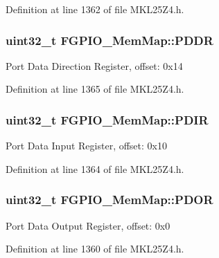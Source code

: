 Definition at line 1362 of file M\+K\+L25\+Z4.\+h.

\subsubsection[{\texorpdfstring{P\+D\+DR}{PDDR}}]{\setlength{\rightskip}{0pt plus 5cm}uint32\+\_\+t F\+G\+P\+I\+O\+\_\+\+Mem\+Map\+::\+P\+D\+DR}\hypertarget{struct_f_g_p_i_o___mem_map_add5e56027e27e8a0076bf1c38fdcaed5}{}\label{struct_f_g_p_i_o___mem_map_add5e56027e27e8a0076bf1c38fdcaed5}
Port Data Direction Register, offset\+: 0x14 

Definition at line 1365 of file M\+K\+L25\+Z4.\+h.

\subsubsection[{\texorpdfstring{P\+D\+IR}{PDIR}}]{\setlength{\rightskip}{0pt plus 5cm}uint32\+\_\+t F\+G\+P\+I\+O\+\_\+\+Mem\+Map\+::\+P\+D\+IR}\hypertarget{struct_f_g_p_i_o___mem_map_af869762f9d42637f8fc09354e8947834}{}\label{struct_f_g_p_i_o___mem_map_af869762f9d42637f8fc09354e8947834}
Port Data Input Register, offset\+: 0x10 

Definition at line 1364 of file M\+K\+L25\+Z4.\+h.

\subsubsection[{\texorpdfstring{P\+D\+OR}{PDOR}}]{\setlength{\rightskip}{0pt plus 5cm}uint32\+\_\+t F\+G\+P\+I\+O\+\_\+\+Mem\+Map\+::\+P\+D\+OR}\hypertarget{struct_f_g_p_i_o___mem_map_ab549d3ecd17467804bc780c97f83e034}{}\label{struct_f_g_p_i_o___mem_map_ab549d3ecd17467804bc780c97f83e034}
Port Data Output Register, offset\+: 0x0 

Definition at line 1360 of file M\+K\+L25\+Z4.\+h.


